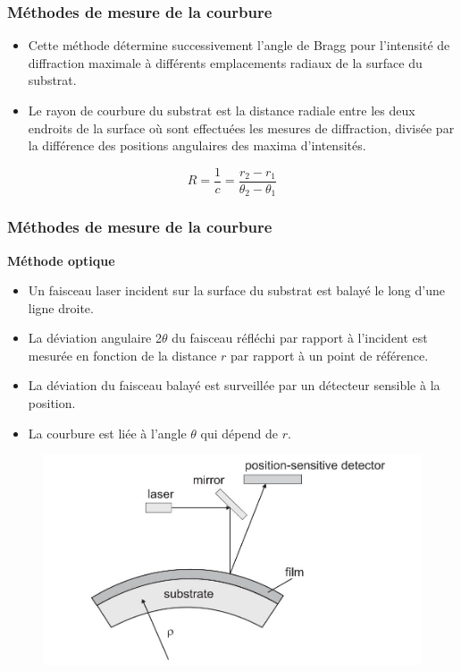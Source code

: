 \begin{frame}
    \frametitle{Méthodes de mesure de la courbure}
    \begin{itemize}
        \item Cette méthode détermine successivement l'angle de Bragg pour l'intensité de diffraction maximale à différents emplacements radiaux de la surface du substrat.
        \item Le rayon de courbure du substrat est la distance radiale entre les deux endroits de la surface où sont effectuées les mesures de diffraction, divisée par la différence des positions angulaires des maxima d'intensités.
    \end{itemize}
    $$R = \frac{1}{c} = \frac{r_2-r_1}{\theta _2-\theta_1}$$
\end{frame}

\begin{frame}
    \frametitle{Méthodes de mesure de la courbure}
    \textbf{\Large{Méthode optique}}
    \begin{itemize}
        \item Un faisceau laser incident sur la surface du substrat est balayé le long d'une ligne droite.
        \item La déviation angulaire 2$\theta$ du faisceau réfléchi par rapport à l'incident est mesurée en fonction de la distance $r$ par rapport à un point de référence.
        \item La déviation du faisceau balayé est surveillée par un détecteur sensible à la position.
        \item La courbure est liée à l'angle $\theta$ qui dépend de $r$.
    \end{itemize}
    \begin{figure}
        \centering
        \includegraphics[scale=0.3]{imgs/laser method.JPG}
    \end{figure}
\end{frame}

